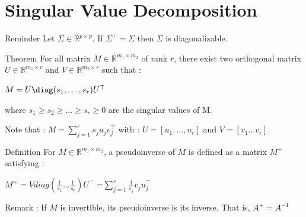 \documentclass[unknownkeysallowed]{beamer}
\begin{document}
\section{Singular Value Decomposition}
\label{sec:conclusion}

\begin{frame}
\begin{block}{Reminder}
Let $\Sigma\in\mathbb{R}^{p \times p}$.
\newline
If $\Sigma^{\top}=\Sigma$ then $\Sigma$ is diagonalizable.
\end{block}
\begin{alertblock}{Theorem}
For all matrix $M\in\mathbb{R}^{m_1 \times m_2}$ of rank $r$, there exist two orthogonal matrix $U\in \mathbb{R}^{m_1 \times r}$ and $V\in\mathbb{R}^{m_2 \times r}$ such that :
\begin{center}
    $M=U \diag(s_{1},\dots, s_{r})U^{\top}$
\end{center}
where $s_{1}\ge s_{2} \ge ... \ge s_{r} \ge 0$ are the singular values of M.
\end{alertblock}
\vspace{0.5cm}
Note that : $M=\sum_{j=1}^r s_{j}u_{j}v_{j}^{\top}$ with : $U=[u_{1},\dots,u_{r}]$ and $V=[v_{1} \dots v_{r}]$.
\end{frame}

\begin{frame}
\begin{block}{Definition}
For $M\in\mathbb{R}^{m_1 \times m_2}$, a pseudoinverse of $M$ is defined as a matrix $M^{+}$ satisfying :
\begin{center}
    $M^{+}=Vdiag(\frac{1}{s_{1}} \dots \frac{1}{s_{r}})U^{\top}$
    =$\sum\limits_{j=1}^r \frac{1}{s_{j}}v_{j}u_{j}^{\top}$
\end{center}
\end{block}
\vspace{0.5cm}
Remark : If $M$ is invertible, its pseudoinverse is its inverse. That is, $A^{+}=A^{-1}$
\end{frame}
\end{document}
